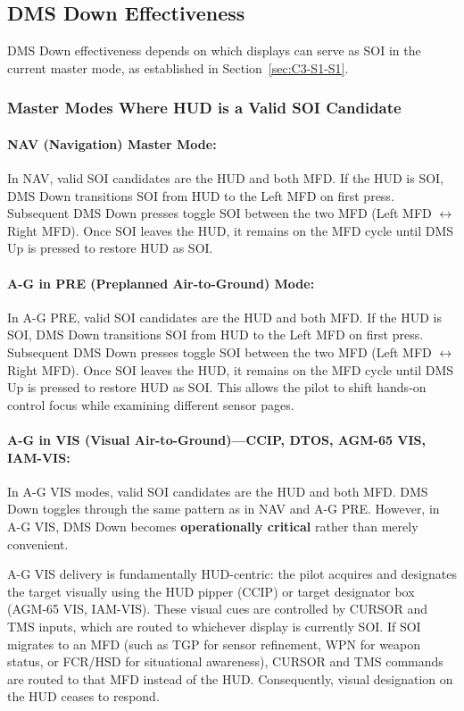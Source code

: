 \documentclass[11pt, a4paper, twoside]{report}
\begin{document}
\subsection{DMS Down Effectiveness}
\label{sec:C3-S3-S1}
DMS Down effectiveness depends on which displays can serve as SOI in the current master 
mode, as established in Section~\ref{sec:C3-S1-S1}.

\subsubsection{Master Modes Where HUD is a Valid SOI Candidate}
\label{sec:C3-S3-S1-S1}

\paragraph{NAV (Navigation) Master Mode:}
In NAV, valid SOI candidates are the HUD and both MFD. If the HUD is SOI, DMS Down transitions SOI from HUD to the Left MFD on first press. Subsequent DMS Down presses toggle SOI between the two MFD (Left MFD $\leftrightarrow$ Right MFD). Once SOI leaves the HUD, it remains on the MFD cycle until DMS Up is pressed to restore HUD as SOI.

\paragraph{A-G in PRE (Preplanned Air-to-Ground) Mode:}
In A-G PRE, valid SOI candidates are the HUD and both MFD. If the HUD is SOI, DMS Down transitions SOI from HUD to the Left MFD on first press. Subsequent DMS Down presses toggle SOI between the two MFD (Left MFD $\leftrightarrow$ Right MFD). Once SOI leaves the HUD, it remains on the MFD cycle until DMS Up is pressed to restore HUD as SOI. This allows the pilot to shift hands-on control focus while examining different sensor pages.

\paragraph{A-G in VIS (Visual Air-to-Ground)---CCIP, DTOS, AGM-65 VIS, IAM-VIS:}
In A-G VIS modes, valid SOI candidates are the HUD and both MFD. DMS Down toggles through the same pattern as in NAV and A-G PRE. However, in A-G VIS, DMS Down becomes \textbf{operationally critical} rather than merely convenient.

A-G VIS delivery is fundamentally HUD-centric: the pilot acquires and designates the target visually using the HUD pipper (CCIP) or target designator box (AGM-65 VIS, IAM-VIS). These visual cues are controlled by CURSOR and TMS inputs, which are routed to whichever display is currently SOI. If SOI migrates to an MFD (such as TGP for sensor refinement, WPN for weapon 
status, or FCR/HSD for situational awareness), CURSOR and TMS commands are routed to that MFD instead of the HUD. Consequently, visual designation on the HUD ceases to respond.
\end{document}
